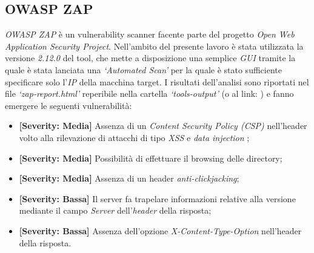 \subsection{OWASP ZAP}
\emph{OWASP ZAP} è un vulnerability scanner facente parte del progetto \emph{Open Web Application Security Project}. Nell'ambito del presente lavoro è stata utilizzata la versione \emph{2.12.0} del tool, che mette a disposizione una semplice \emph{GUI} tramite la quale è stata lanciata una \emph{`Automated Scan'} per la quale è stato sufficiente specificare solo l'\emph{IP} della macchina target. I risultati dell'analisi sono riportati nel file \emph{`zap-report.html'} reperibile nella cartella \emph{`tools-output'} (o al link: ) e fanno emergere le seguenti vulnerabilità:
\begin{itemize}
    \item \textbf{[Severity: Media]} Assenza di un \emph{Content Security Policy (CSP)} nell'header volto alla rilevazione di attacchi di tipo \emph{XSS} e \emph{data injection} \cite{csp};
    \item \textbf{[Severity: Media]} Possibilità di effettuare il browsing delle directory;
    \item \textbf{[Severity: Media]} Assenza di un header \emph{anti-clickjacking};
    \item \textbf{[Severity: Bassa]} Il server fa trapelare informazioni relative alla versione mediante il campo \emph{Server} dell'\emph{header} della risposta;
    \item \textbf{[Severity: Bassa]} Assenza dell'opzione \emph{X-Content-Type-Option} nell'header della risposta.
\end{itemize}
